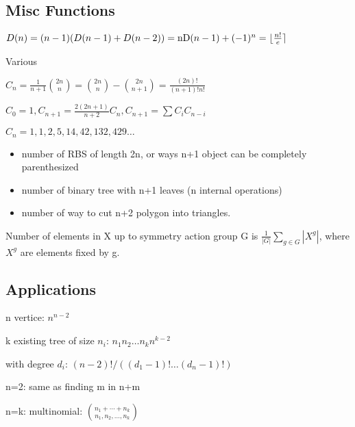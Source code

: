 \subsection{Misc Functions}

$D (n) = (n - 1) (D (n - 1) + D (n - 2)) = \operatorname{nD}
(n - 1) + (- 1)^n = \lfloor \frac{n!}{e} \rceil$

Various
\begin{tmindent}
  $C_n = \frac{1}{n + 1} \binom{2 n}{n} = \binom{2 n}{n} - \binom{2 n}{n + 1}
  = \frac{(2 n) !}{(n + 1) !n!}$
  
  $C_0 = 1, C_{n + 1} = \frac{2 (2 n + 1)}{n + 2} C_n, C_{n + 1} = \sum C_i
  C_{n - i}$
  
  $C_n = 1, 1, 2, 5, 14, 42, 132, 429 \ldots$
  
  \begin{itemize}
    \item number of RBS of length 2n, or ways n+1 object can be completely
    parenthesized
    
    \item number of  binary tree with n+1 leaves (n internal
    operations)
    
    \item number of way to cut n+2 polygon into triangles.
  \end{itemize}
\end{tmindent}
 Number of elements in X up to symmetry action
group G is $\frac{1}{| G |} \sum_{g \in G} | X^g |$, where $X^g$ are elements
fixed by g.

\subsection{Applications}

\begin{tmindent}
  n vertice: $n^{n - 2}$
  
  k existing tree of size $n_i$: $n_1 n_2 \ldots n_k n^{k - 2}$
  
  with degree $d_i$: $(n - 2) ! / ((d_1 - 1) ! \ldots (d_n - 1) !)$
\end{tmindent}
\begin{tmindent}
  n=2: same as finding m in n+m
  
  n=k: multinomial: $\binom{n_1 + \cdots + n_k}{n_1, n_2, \ldots, n_k}$
\end{tmindent}

